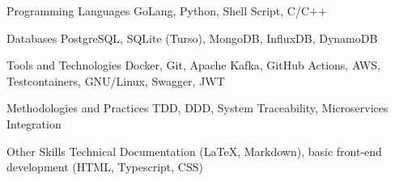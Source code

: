 
\begin{cvskills}
  \cvskill
  {Programming Languages}
  {GoLang, Python, Shell Script, C/C++}

  \cvskill
  {Databases}
  {PostgreSQL, SQLite (Turso), MongoDB, InfluxDB, DynamoDB}

  \cvskill
  {Tools and Technologies}
  {Docker, Git, Apache Kafka, GitHub Actions, AWS, Testcontainers, GNU/Linux, Swagger, JWT}

  \cvskill
  {Methodologies and Practices}
  {TDD, DDD, System Traceability, Microservices Integration}

  \cvskill
  {Other Skills}
  {Technical Documentation (LaTeX, Markdown), basic front-end development (HTML, Typescript, CSS)}
\end{cvskills}
